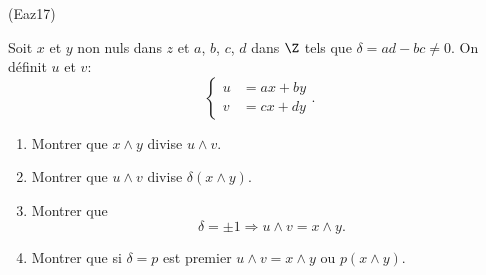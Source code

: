 \begin{tiny}(Eaz17)\end{tiny} Soit $x$ et $y$ non nuls dans $z$ et $a$, $b$, $c$, $d$ dans $\Z$ tels que $\delta = ad-bc \neq 0$. On définit $u$ et $v$:
\[
 \left\lbrace 
 \begin{aligned}
  u &= ax + by \\ v &= cx + dy
 \end{aligned}
\right. .
\]
\begin{enumerate}
 \item Montrer que $x \wedge y$ divise $u \wedge v$.
 \item Montrer que $u \wedge v$ divise $\delta (x \wedge y)$.
 \item Montrer que 
\[
 \delta =\pm 1 \Rightarrow u \wedge v = x \wedge y .
\]
 \item Montrer que si $\delta=p$ est premier $u \wedge v = x\wedge y$ ou $p(x\wedge y)$.
\end{enumerate}
